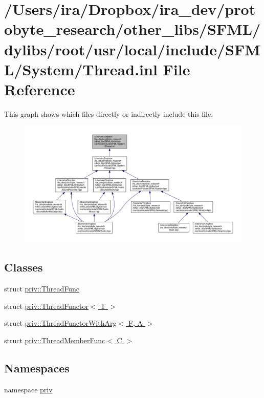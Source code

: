 \hypertarget{_thread_8inl}{\section{/\-Users/ira/\-Dropbox/ira\-\_\-dev/protobyte\-\_\-research/other\-\_\-libs/\-S\-F\-M\-L/dylibs/root/usr/local/include/\-S\-F\-M\-L/\-System/\-Thread.inl File Reference}
\label{_thread_8inl}
}
This graph shows which files directly or indirectly include this file\-:
\nopagebreak
\begin{figure}[H]
\begin{center}
\leavevmode
\includegraphics[width=350pt]{_thread_8inl__dep__incl}
\end{center}
\end{figure}
\subsection*{Classes}
\begin{DoxyCompactItemize}
\item 
struct \hyperlink{structpriv_1_1_thread_func}{priv\-::\-Thread\-Func}
\item 
struct \hyperlink{structpriv_1_1_thread_functor}{priv\-::\-Thread\-Functor$<$ T $>$}
\item 
struct \hyperlink{structpriv_1_1_thread_functor_with_arg}{priv\-::\-Thread\-Functor\-With\-Arg$<$ F, A $>$}
\item 
struct \hyperlink{structpriv_1_1_thread_member_func}{priv\-::\-Thread\-Member\-Func$<$ C $>$}
\end{DoxyCompactItemize}
\subsection*{Namespaces}
\begin{DoxyCompactItemize}
\item 
namespace \hyperlink{namespacepriv}{priv}
\end{DoxyCompactItemize}
